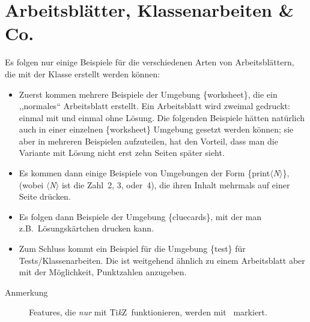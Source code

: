 \documentclass[hyperworksheet]{drcschool}
\makeatletter
\newcommand*{\env}[1]{\textup{\ttfamily\{#1\}}}                            %
\newcommand*{\param}[1]{\mbox{\normalfont$\langle$\textit{#1}$\rangle$}}   %
\newcommand*{\TikZ}{\textup{Ti\textit{k}Z}}                                %
\newcommand*{\onlytikz}{%
   \textcolor{red}{%
      \vtop{%
         \vbox{%
            \vss                                                           %
            \hrule height\p@                                               %
            \kern2\p@                                                      %
            \hbox{\normalfont\normalsize! \TikZ\ !}%
         }%
         \kern2\p@                                                         %
         \hrule height\p@                                                  %
      }%
   }%
}                                                                          %
\makeatother
\begin{document}
\section{Arbeitsblätter, Klassenarbeiten \& Co.}
Es folgen nur einige Beispiele für die verschiedenen Arten von Arbeitsblättern, die mit
der Klasse erstellt werden können:
\begin{itemize}
\item Zuerst kommen mehrere Beispiele der Umgebung \env{worksheet}, die ein ,,normales``
      Arbeitsblatt erstellt. Ein Arbeitsblatt wird zweimal gedruckt: einmal mit und
      einmal ohne Lösung. Die folgenden Beispiele hätten natürlich auch in einer
      einzelnen \env{worksheet} Umgebung gesetzt werden können; sie aber in mehreren
      Beispielen aufzuteilen, hat den Vorteil, dass man die Variante mit Lösung nicht
      erst zehn Seiten später sieht.
\item Es kommen dann einige Beispiele von Umgebungen der Form \env{print\param{N}},
      (wobei \param{N} ist die Zahl~2, 3, oder~4), die ihren Inhalt mehrmals auf einer
      Seite drücken.
\item Es folgen dann Beispiele der Umgebung \env{cluecards}, mit der man z.B.~Lösungskärtchen drucken kann.
\item Zum Schluss kommt ein Beispiel für die Umgebung \env{test} für Tests/Klassenarbeiten.
      Die ist weitgehend ähnlich zu einem Arbeitsblatt aber mit der Möglichkeit,
      Punktzahlen anzugeben.
\end{itemize}

\begin{description}
\item[Anmerkung] Features, die \emph{nur} mit \TikZ\ funktionieren, werden mit
\onlytikz\ markiert.
\end{description}
\end{document}
